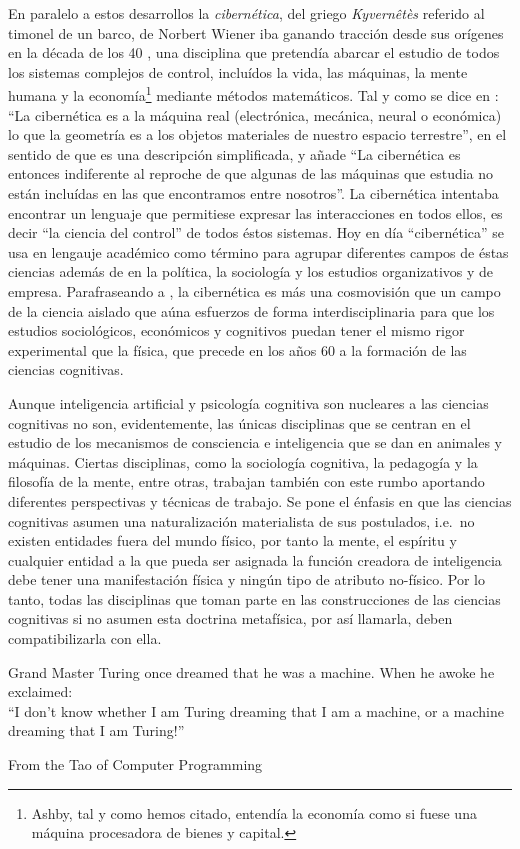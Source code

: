 \documentclass[12pt]{memoir}
\begin{document}
\begin{appendices}
En paralelo a estos desarrollos la \textit{cibernética}, del griego \textit{Kyvernêtès} referido al timonel de un barco, de Norbert Wiener iba ganando tracción desde sus orígenes en la década de los 40 \parencite[p.142-143]{theCognitiveRevolution}, una disciplina que pretendía abarcar el estudio de todos los sistemas complejos de control, incluídos la vida, las máquinas, la mente humana y la economía\footnote{Ashby, tal y como hemos citado, entendía la economía como si fuese una máquina procesadora de bienes y capital.} mediante métodos matemáticos. Tal y como se dice en \parencite[p.12]{ciberneticsAshby}: ``La cibernética es a la máquina real (electrónica, mecánica, neural o económica) lo que la geometría es a los objetos materiales de nuestro espacio terrestre'', en el sentido de que es una descripción simplificada, y añade ``La cibernética es entonces indiferente al reproche de que algunas de las máquinas que estudia no están incluídas en las que encontramos entre nosotros''. La cibernética intentaba encontrar un lenguaje que permitiese expresar las interacciones en todos ellos, es decir ``la ciencia del control'' de todos éstos sistemas. Hoy en día ``cibernética'' se usa en lengauje académico como término para agrupar diferentes campos de éstas ciencias además de en la política, la sociología y los estudios organizativos y de empresa. Parafraseando a \parencite[p.103-104 y p.207-216]{pylyshyn70}, la cibernética es más una cosmovisión que un campo de la ciencia aislado que aúna esfuerzos de forma interdisciplinaria para que los estudios sociológicos, económicos y cognitivos puedan tener el mismo rigor experimental que la física, que precede en los años 60 a la formación de las ciencias cognitivas.

Aunque inteligencia artificial y psicología cognitiva son nucleares a las ciencias cognitivas no son, evidentemente, las únicas disciplinas que se centran en el estudio de los mecanismos de consciencia e inteligencia que se dan en animales y máquinas. Ciertas disciplinas, como la sociología cognitiva, la pedagogía y la filosofía de la mente, entre otras, trabajan también con este rumbo aportando diferentes perspectivas y técnicas de trabajo. Se pone el énfasis en que las ciencias cognitivas asumen una naturalización materialista de sus postulados, i.e.\ no existen entidades fuera del mundo físico, por tanto la mente, el espíritu y cualquier entidad a la que pueda ser asignada la función creadora de inteligencia debe tener una manifestación física y ningún tipo de atributo no-físico. Por lo tanto, todas las disciplinas que toman parte en las construcciones de las ciencias cognitivas si no asumen esta doctrina metafísica, por así llamarla, deben compatibilizarla con ella.
\end{appendices}



\newpage

\printbibliography

\newpage
\epigraph{Grand Master Turing once dreamed that he was a machine. When he awoke he exclaimed: \\

“I don't know whether I am Turing dreaming that I am a machine, or a machine dreaming that I am Turing!”}{From the Tao of Computer Programming}
\end{document}
